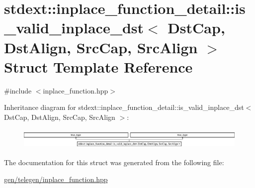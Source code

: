 \hypertarget{structstdext_1_1inplace__function__detail_1_1is__valid__inplace__dst}{}\section{stdext\+:\+:inplace\+\_\+function\+\_\+detail\+:\+:is\+\_\+valid\+\_\+inplace\+\_\+dst$<$ Dst\+Cap, Dst\+Align, Src\+Cap, Src\+Align $>$ Struct Template Reference}
\label{structstdext_1_1inplace__function__detail_1_1is__valid__inplace__dst}


{\ttfamily \#include $<$inplace\+\_\+function.\+hpp$>$}

Inheritance diagram for stdext\+:\+:inplace\+\_\+function\+\_\+detail\+:\+:is\+\_\+valid\+\_\+inplace\+\_\+dst$<$ Dst\+Cap, Dst\+Align, Src\+Cap, Src\+Align $>$\+:\begin{figure}[H]
\begin{center}
\leavevmode
\includegraphics[height=1.038961cm]{structstdext_1_1inplace__function__detail_1_1is__valid__inplace__dst}
\end{center}
\end{figure}


The documentation for this struct was generated from the following file\+:\begin{DoxyCompactItemize}
\item 
\hyperlink{gen_2telegen_2inplace__function_8hpp}{gen/telegen/inplace\+\_\+function.\+hpp}\end{DoxyCompactItemize}
